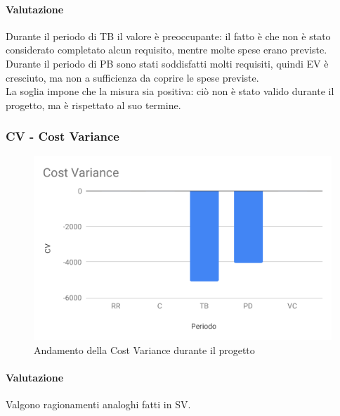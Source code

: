 \paragraph*{Valutazione}
Durante il periodo di TB il valore è preoccupante: il fatto è che non è stato considerato completato alcun requisito, mentre molte spese erano previste.\\
Durante il periodo di PB sono stati soddisfatti molti requisiti, quindi EV è cresciuto, ma non a sufficienza da coprire le spese previste.\\
La soglia impone che la misura sia positiva: ciò non è stato valido durante il progetto, ma è rispettato al suo termine.

\subsubsection{CV - Cost Variance}
\begin{figure}[H]
	\centering
	\includegraphics[scale=0.7]{res/images/RA/cv.pdf}
	\caption{Andamento della Cost Variance durante il progetto}
\end{figure}
\paragraph*{Valutazione}
Valgono ragionamenti analoghi fatti in SV.



